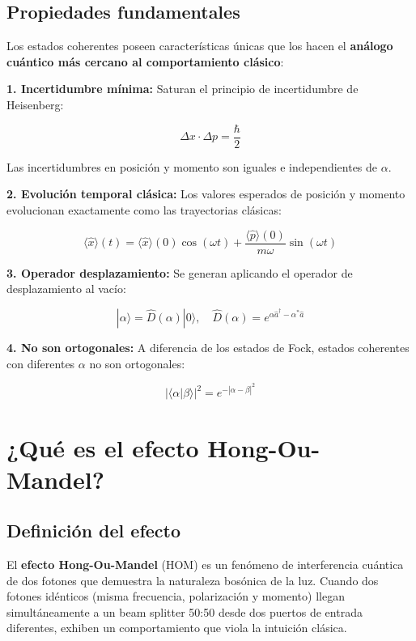 \documentclass[11pt,a4paper,spanish]{book}
\begin{document}
\subsection*{Propiedades fundamentales}

Los estados coherentes poseen características únicas que los hacen el \textbf{análogo cuántico más cercano al comportamiento clásico}:

\textbf{1. Incertidumbre mínima:} Saturan el principio de incertidumbre de Heisenberg:

\[
\Delta x \cdot \Delta p = \frac{\hbar}{2}
\]

Las incertidumbres en posición y momento son iguales e independientes de $\alpha$.

\textbf{2. Evolución temporal clásica:} Los valores esperados de posición y momento evolucionan exactamente como las trayectorias clásicas:

\[
\langle \hat{x} \rangle(t) = \langle \hat{x} \rangle(0) \cos(\omega t) + \frac{\langle \hat{p} \rangle(0)}{m\omega} \sin(\omega t)
\]

\textbf{3. Operador desplazamiento:} Se generan aplicando el operador de desplazamiento al vacío:

\[
|\alpha\rangle = \hat{D}(\alpha)|0\rangle, \quad \hat{D}(\alpha) = e^{\alpha\hat{a}^\dagger - \alpha^*\hat{a}}
\]

\textbf{4. No son ortogonales:} A diferencia de los estados de Fock, estados coherentes con diferentes $\alpha$ no son ortogonales:

\[
|\langle\alpha|\beta\rangle|^2 = e^{-|\alpha-\beta|^2}
\]


\section{¿Qué es el efecto Hong-Ou-Mandel?} \label{sec:hong}

\subsection*{Definición del efecto}

El \textbf{efecto Hong-Ou-Mandel} (HOM) \citep{hong1987} es un fenómeno de interferencia cuántica de dos fotones que demuestra la naturaleza bosónica de la luz. Cuando dos fotones idénticos (misma frecuencia, polarización y momento) llegan simultáneamente a un beam splitter 50:50 desde dos puertos de entrada diferentes, exhiben un comportamiento que viola la intuición clásica.
\end{document}
